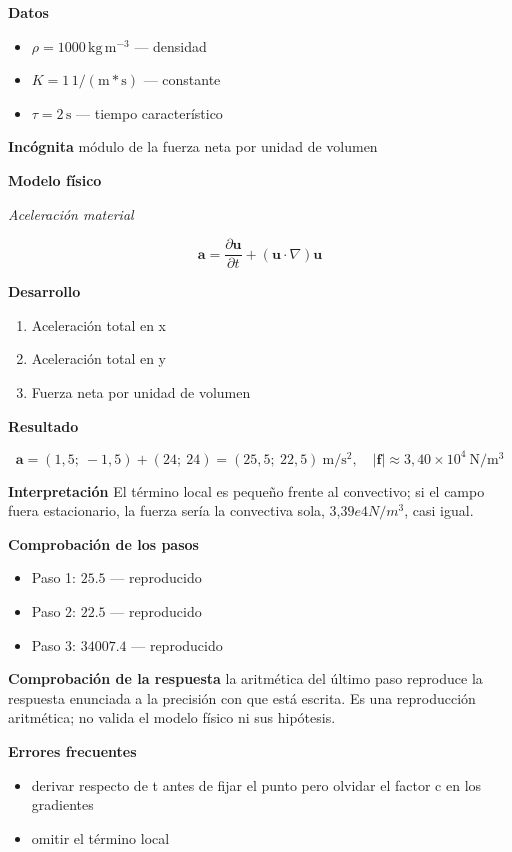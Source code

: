 \documentclass[10pt,openany]{book}
\begin{document}
\noindent\textbf{Datos}
\begin{itemize}
\item $\rho = 1000\,\mathrm{kg}\,\mathrm{m}^{-3}$ — densidad
\item $K = 1\,\mathrm{1/(m*s)}$ — constante
\item $\tau = 2\,\mathrm{s}$ — tiempo característico
\end{itemize}

\noindent\textbf{Incógnita}
módulo de la fuerza neta por unidad de volumen

\noindent\textbf{Modelo físico}

\noindent\textit{Aceleración material}

\[
\mathbf{a} = \frac{\partial\mathbf{u}}{\partial t} + (\mathbf{u}\cdot\nabla)\mathbf{u}
\]

\noindent\textbf{Desarrollo}
\begin{enumerate}
\item
Aceleración total en x
\item
Aceleración total en y
\item
Fuerza neta por unidad de volumen
\end{enumerate}

\noindent\textbf{Resultado}

\[
\mathbf{a} = (1{,}5;\ -1{,}5) + (24;\ 24) = (25{,}5;\ 22{,}5)\ \mathrm{m/s^{2}},\quad |\mathbf{f}| \approx 3{,}40\times 10^{4}\ \mathrm{N/m^{3}}
\]

\noindent\textbf{Interpretación}
El término local es pequeño frente al convectivo; si el campo fuera estacionario, la fuerza sería la convectiva sola, 3,\(39e4 N/m^3\), casi igual.

\noindent\textbf{Comprobación de los pasos}
\begin{itemize}
\item Paso 1: $25.5$ — reproducido
\item Paso 2: $22.5$ — reproducido
\item Paso 3: $34007.4$ — reproducido
\end{itemize}

\noindent\textbf{Comprobación de la respuesta} la aritmética del último paso reproduce la respuesta enunciada a la precisión con que está escrita. Es una reproducción aritmética; no valida el modelo físico ni sus hipótesis.

\noindent\textbf{Errores frecuentes}
\begin{itemize}
\item derivar respecto de t antes de fijar el punto pero olvidar el factor c en los gradientes
\item omitir el término local
\end{itemize}
\end{document}
